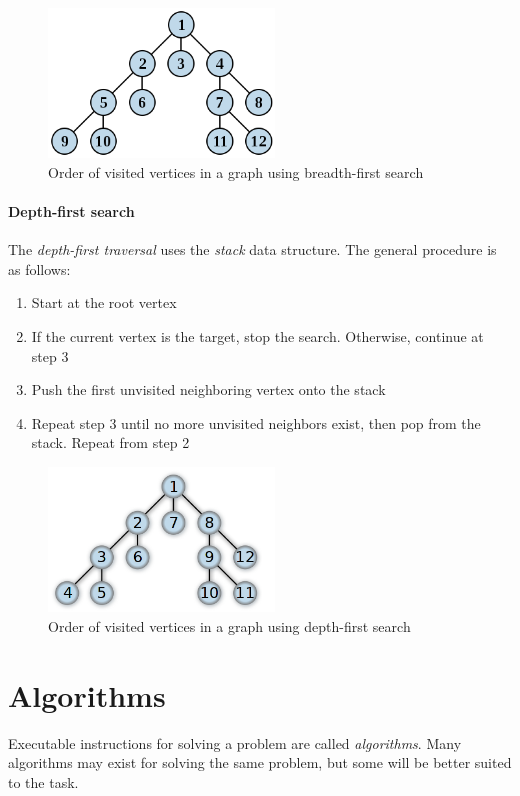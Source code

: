 \documentclass{article}
\begin{document}
\begin{figure}[H]
  \centering
  \includegraphics[width=6cm]{breadth_first_search}
  \caption{Order of visited vertices in a graph using breadth-first search}
\end{figure}

\paragraph{Depth-first search}
The {\em depth-first traversal} uses the {\em stack} data structure. The general procedure is as follows:
\begin{enumerate}
\item{Start at the root vertex}
\item{If the current vertex is the target, stop the search. Otherwise, continue at step 3}
\item{Push the first unvisited neighboring vertex onto the stack}
\item{Repeat step 3 until no more unvisited neighbors exist, then pop from the stack. Repeat from step 2}
\end{enumerate}

\begin{figure}[H]
  \centering
  \includegraphics[width=6cm]{depth_first_search}
  \caption{Order of visited vertices in a graph using depth-first search}
\end{figure}




\section{Algorithms}
Executable instructions for solving a problem are called {\em algorithms}. Many algorithms may exist for solving the same
problem, but some will be better suited to the task.
\end{document}
